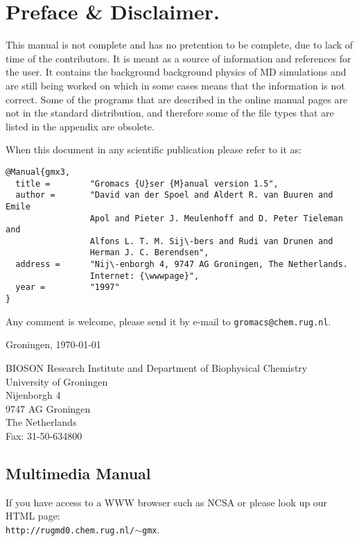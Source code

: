 \documentclass[11pt,dvips]{book}
\newcommand{\wwwpage}{\tt http://rugmd0.chem.rug.nl/$\sim$gmx}
\begin{document}
\newpage
\section*{Preface \& Disclaimer.}
This manual is not complete and has no pretention to be complete, 
due to lack of time of the contributors.
It is meant as a source of information and references for the {\gromacs} user.
It contains the background background physics of MD simulations and
are still being worked on which in some cases means that the information is
not correct. Some of the programs that are described in the online manual
pages are not in the standard distribution, and therefore some of the
file types that are listed in the appendix are obsolete.

When  this document in any scientific publication
please refer to it as:	\\
\begin{verbatim}
@Manual{gmx3,
  title =        "Gromacs {U}ser {M}anual version 1.5",
  author =       "David van der Spoel and Aldert R. van Buuren and Emile
                 Apol and Pieter J. Meulenhoff and D. Peter Tieleman and
                 Alfons L. T. M. Sij\-bers and Rudi van Drunen and
                 Herman J. C. Berendsen",
  address =      "Nij\-enborgh 4, 9747 AG Groningen, The Netherlands.
                 Internet: {\wwwpage}",
  year =         "1997"
}
\end{verbatim}

Any comment is welcome, please send it by e-mail to
{\tt gromacs@chem.rug.nl}. 
\medskip

Groningen, \today
\medskip

{\sf BIOSON} Research Institute and Department of Biophysical Chemistry	\\
University of Groningen \\ 
Nijenborgh 4				\\
9747 AG Groningen			\\
The Netherlands				\\
Fax: 31-50-634800

\newpage
\subsection*{Multimedia Manual}
If you  have access to a WWW browser such as NCSA 
or 
please look up
our HTML page: \\
{\wwwpage}.
\end{document}
